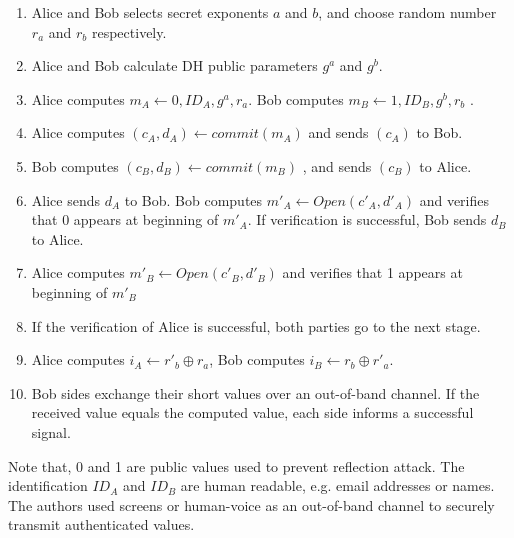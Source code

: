\begin{enumerate}
\item Alice and Bob selects secret exponents $a$ and $b$, and choose random number $r_a$ and $r_b$ respectively. 
\item Alice and Bob calculate DH public parameters $g^a$ and $g^b$. 
\item Alice computes $m_A \leftarrow 0,ID_A,g^a,r_a$. Bob computes $m_B \leftarrow 1,ID_B,g^b,r_b$ .
\item Alice computes $(c_A,d_A) \leftarrow commit(m_A)$ and sends $(c_A)$ to Bob.
\item Bob computes $(c_B,d_B) \leftarrow commit(m_B)$ , and sends $(c_B)$ to Alice.
\item Alice sends $d_A$ to Bob. Bob computes $m'_A \leftarrow Open(c'_A,d'_A)$ and verifies that 0 appears at beginning of $m'_A$. If verification is successful, Bob sends $d_B$ to Alice.
\item Alice computes $m'_B \leftarrow Open(c'_B,d'_B)$ and verifies that 1 appears at beginning of $m'_B$
 \item If the verification of Alice is successful, both parties go to the next stage.
\item Alice computes $i_A \leftarrow r'_b \oplus r_a$, Bob computes $i_B \leftarrow r_b \oplus r'_a$.
\item Bob sides exchange their short values over an out-of-band channel. If the received value equals the computed value, each side informs a successful signal. 
\end{enumerate}

Note that, 0 and 1 are public values used to prevent reflection attack. The identification $ID_A$ and $ID_B$ are human readable, e.g. email addresses or names. The authors used screens or human-voice as an out-of-band channel to securely transmit authenticated values.
 
